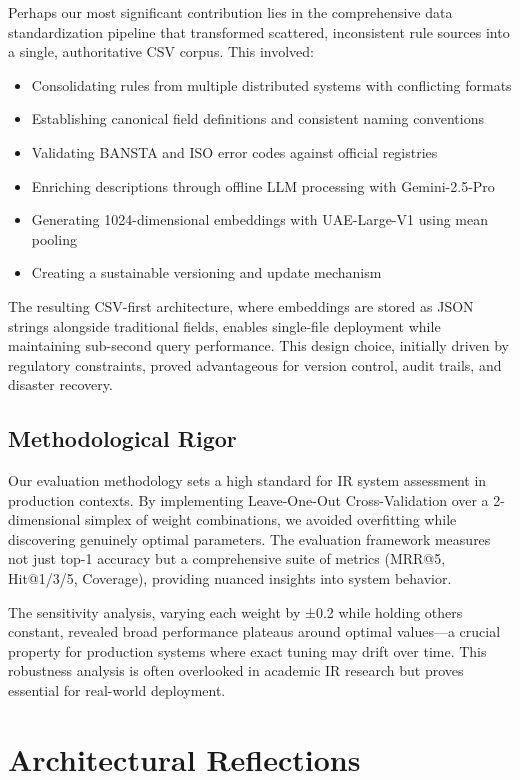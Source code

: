 Perhaps our most significant contribution lies in the comprehensive data standardization pipeline that transformed scattered, inconsistent rule sources into a single, authoritative CSV corpus. This involved:
\begin{itemize}[leftmargin=*,itemsep=2pt,topsep=2pt]
 \item Consolidating rules from multiple distributed systems with conflicting formats
 \item Establishing canonical field definitions and consistent naming conventions
 \item Validating BANSTA and ISO error codes against official registries
 \item Enriching descriptions through offline LLM processing with Gemini-2.5-Pro
 \item Generating 1024-dimensional embeddings with UAE-Large-V1 using mean pooling
 \item Creating a sustainable versioning and update mechanism
\end{itemize}

The resulting CSV-first architecture, where embeddings are stored as JSON strings alongside traditional fields, enables single-file deployment while maintaining sub-second query performance. This design choice, initially driven by regulatory constraints, proved advantageous for version control, audit trails, and disaster recovery.

\subsection{Methodological Rigor}

Our evaluation methodology sets a high standard for IR system assessment in production contexts. By implementing Leave-One-Out Cross-Validation over a 2-dimensional simplex of weight combinations, we avoided overfitting while discovering genuinely optimal parameters. The evaluation framework measures not just top-1 accuracy but a comprehensive suite of metrics (MRR@5, Hit@1/3/5, Coverage), providing nuanced insights into system behavior.

The sensitivity analysis, varying each weight by ±0.2 while holding others constant, revealed broad performance plateaus around optimal values—a crucial property for production systems where exact tuning may drift over time. This robustness analysis is often overlooked in academic IR research but proves essential for real-world deployment.

\section{Architectural Reflections}

